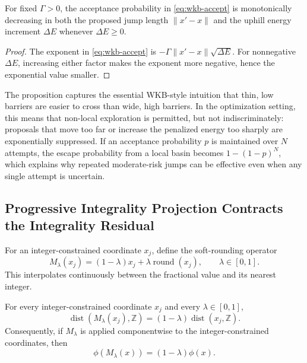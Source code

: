 \begin{proposition}
\label{prop:wkb}
For fixed $\Gamma > 0$, the acceptance probability in \eqref{eq:wkb-accept} is monotonically decreasing in both the proposed jump length $\|x'-x\|$ and the uphill energy increment $\Delta E$ whenever $\Delta E \geq 0$.
\end{proposition}

\begin{proof}
The exponent in \eqref{eq:wkb-accept} is $-\Gamma \|x'-x\| \sqrt{\Delta E}$. For nonnegative $\Delta E$, increasing either factor makes the exponent more negative, hence the exponential value smaller.
\end{proof}

The proposition captures the essential WKB-style intuition that thin, low barriers are easier to cross than wide, high barriers. In the optimization setting, this means that non-local exploration is permitted, but not indiscriminately: proposals that move too far or increase the penalized energy too sharply are exponentially suppressed. If an acceptance probability $p$ is maintained over $N$ attempts, the escape probability from a local basin becomes $1-(1-p)^N$, which explains why repeated moderate-risk jumps can be effective even when any single attempt is uncertain.

\subsection{Progressive Integrality Projection Contracts the Integrality Residual}

For an integer-constrained coordinate $x_j$, define the soft-rounding operator
\begin{equation}
\label{eq:soft-round}
    M_\lambda(x_j) = (1-\lambda)x_j + \lambda \operatorname{round}(x_j),
    \qquad \lambda \in [0,1].
\end{equation}
This interpolates continuously between the fractional value and its nearest integer.

\begin{theorem}
\label{thm:measurement}
For every integer-constrained coordinate $x_j$ and every $\lambda \in [0,1]$,
\begin{equation}
    \operatorname{dist}(M_\lambda(x_j), \mathbb{Z}) = (1-\lambda)\operatorname{dist}(x_j, \mathbb{Z}).
\end{equation}
Consequently, if $M_\lambda$ is applied componentwise to the integer-constrained coordinates, then
\begin{equation}
    \phi(M_\lambda(x)) = (1-\lambda)\phi(x).
\end{equation}
\end{theorem}

